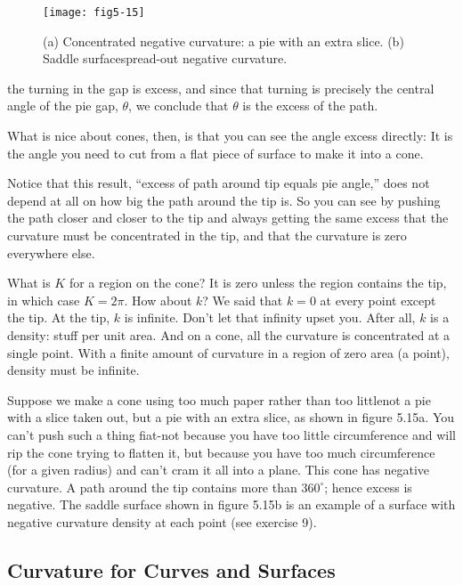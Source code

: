 \documentclass{book}
\begin{document}
\begin{figure}
\begin{center}
\texttt{[image: fig5-15]}
\caption{(a) Concentrated negative curvature: a pie with an extra slice. (b) Saddle surfacespread-out negative curvature.}
\end{center}
\end{figure}

the turning in the gap is excess, and since that turning is precisely the
central angle of the pie gap, $\theta$, we conclude that $\theta$ is the excess of the
path.

What is nice about cones, then, is that you can see the angle excess
directly: It is the angle you need to cut from a flat piece of surface to
make it into a cone.

Notice that this result, ``excess of path around tip equals pie angle,''
does not depend at all on how big the path around the tip is. So you can
see by pushing the path closer and closer to the tip and always getting
the same excess that the curvature must be concentrated in the tip, and
that the curvature is zero everywhere else.

What is $K$ for a region on the cone? It is zero unless the region
contains the tip, in which case $K = 2 \pi$. How about $k$? We said that
$k = 0$ at every point except the tip. At the tip, $k$ is infinite. Don't
let that infinity upset you. After all, $k$ is a density: stuff per unit area.
And on a cone, all the curvature is concentrated at a single point. With
a finite amount of curvature in a region of zero area (a point), density
must be infinite.

Suppose we make a cone using too much paper rather than too littlenot a pie with a slice taken out, but a pie with an extra slice, as shown in
figure 5.15a. You can't push such a thing fiat-not because you have too
little circumference and will rip the cone trying to flatten it, but because
you have too much circumference (for a given radius) and can't cram it
all into a plane. This cone has negative curvature. A path around the tip
contains more than $360^{\circ}$; hence excess is negative. The saddle surface
shown in figure 5.15b is an example of a surface with negative curvature
density at each point (see exercise 9).

\subsection{Curvature for Curves and Surfaces}
\end{document}
